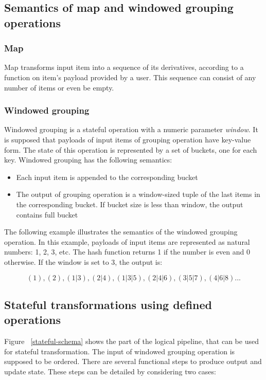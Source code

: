 \subsection{Semantics of map and windowed grouping operations}

\subsubsection{Map}
Map transforms input item into a sequence of its derivatives, according to a function on item's payload provided by a user. This sequence can consist of any number of items or even be empty.

\subsubsection{Windowed grouping}
Windowed grouping is a stateful operation with a numeric parameter {\it window}. It is supposed that payloads of input items of grouping operation have key-value form. The state of this operation is represented by a set of buckets, one for each key. Windowed grouping has the following semantics:

\begin{itemize}
    \item Each input item is appended to the corresponding bucket
    \item The output of grouping operation is a window-sized tuple of the last items in the corresponding bucket. If bucket size is less than window, the output contains full bucket
\end{itemize}

The following example illustrates the semantics of the windowed grouping operation. In this example, payloads of input items are represented as natural numbers: 1, 2, 3, etc. The hash function returns 1 if the number is even and 0 otherwise. If the window is set to 3, the output is:

\[(1), (2), (1|3), (2|4), (1|3|5), (2|4|6), (3|5|7), (4|6|8)...\]

\subsection{Stateful transformations using defined operations}
Figure ~\ref{stateful-schema} shows the part of the logical pipeline, that can be used for stateful transformation. The input of windowed grouping operation is supposed to be ordered. There are several functional steps to produce output and update state. These steps can be detailed by considering two cases:

